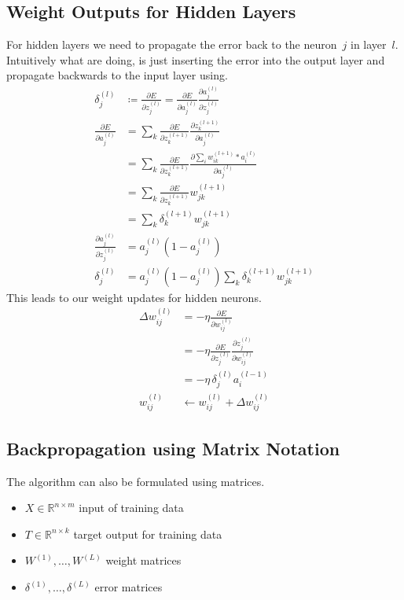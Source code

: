 \subsection{Weight Outputs for Hidden Layers}
For hidden layers we need to propagate the error back to the neuron~$j$ in layer~$l$. Intuitively what are doing, is just inserting the error into the output layer and propagate backwards to the input layer using.
\begin{align}
\delta_j^{(l)} &\coloneqq \frac{\partial E}{\partial z_j^{(l)}} = \frac{\partial E}{\partial a_j^{(l)}} \frac{\partial a_j^{(l)}}{\partial z_j^{(l)}}\\
\frac{\partial E}{\partial a_j^{(l)}}
&= \sum_k \frac{\partial E}{\partial z_k^{(l+1)}} \frac{\partial z_k^{(l+1)}}{\partial a_j^{(l)}}\\
&= \sum_k \frac{\partial E}{\partial z_k^{(l+1)}} \frac{\partial \sum_i w_{ik}^{(l+1)} * a_i^{(l)}}{\partial a_j^{(l)}}\\
&= \sum_k \frac{\partial E}{\partial z_k^{(l+1)}} w_{jk}^{(l+1)}\\
&= \sum_k \delta_k^{(l+1)} w_{jk}^{(l+1)}\\
\frac{\partial a_j^{(l)}}{\partial z_j^{(l)}} &= a_j^{(l)} (1 - a_j^{(l)}) \tag{sigmoid derivative}\\
\delta_j^{(l)} &= a_j^{(l)} (1 - a_j^{(l)}) \sum_k \delta_k^{(l+1)} w_{jk}^{(l+1)}
\end{align}
This leads to our weight updates for hidden neurons.
\begin{align}
\Delta w_{ij}^{(l)} &= - \eta \frac{\partial E}{\partial w_{ij}^{(l)}}\\
&= - \eta \frac{\partial E}{\partial z_j^{(l)}} \frac{\partial z_j^{(l)}}{\partial w_{ij}^{(l)}}\\
&= - \eta\, \delta_j^{(l)} a_i^{(l-1)}\\
w_{ij}^{(l)} &\leftarrow w_{ij}^{(l)} + \Delta w_{ij}^{(l)}
\end{align}


\subsection{Backpropagation using Matrix Notation}
The algorithm can also be formulated using matrices.
\begin{itemize}
\item $X \in \mathbb{R}^{n \times m}$ input of training data
\item $T \in \mathbb{R}^{n \times k}$ target output for training data
\item $W^{(1)},\dots,W^{(L)}$ weight matrices
\item $\delta^{(1)},\dots,\delta^{(L)}$ error matrices
\end{itemize}

